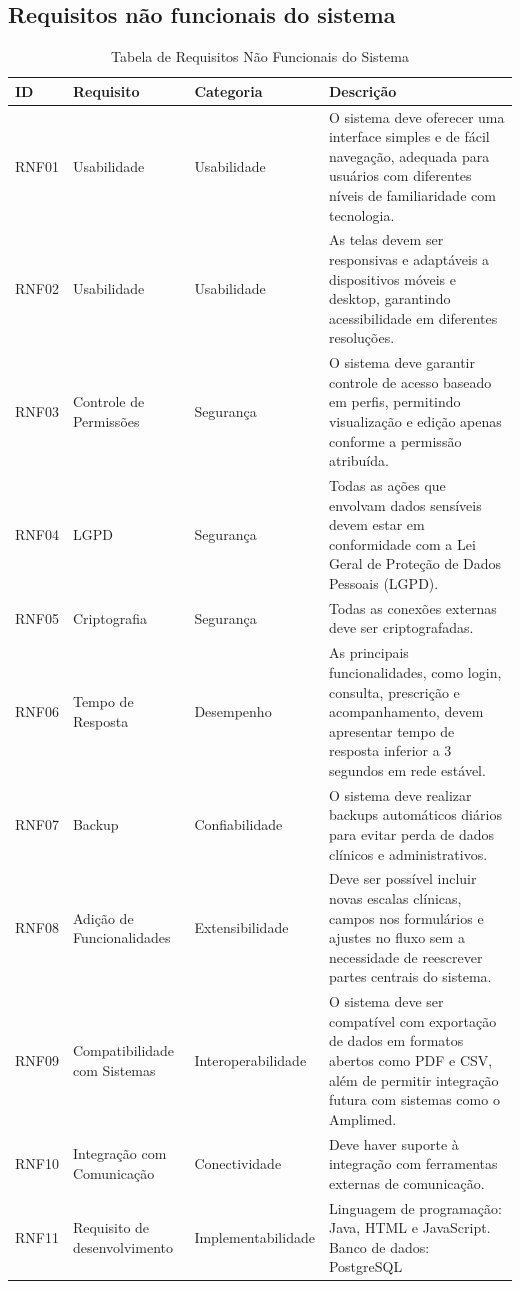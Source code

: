 \href{}{}\documentclass[12pt,portuguese,oneside]{article}
\begin{document}
\subsection{Requisitos não funcionais do sistema}
\begin{table}[H]
\centering
\caption{Tabela de Requisitos Não Funcionais do Sistema}
\begin{tabularx}{\textwidth}{|>{\raggedright\arraybackslash}p{1.5cm}|>{\raggedright\arraybackslash}p{3cm}|>{\raggedright\arraybackslash}p{3.3cm}|>{\raggedright\arraybackslash}X|}
\hline
\rowcolor{gray!20}
\textbf{ID} & \textbf{Requisito} & \textbf{Categoria} & \textbf{Descrição}\\
\hline
RNF01 & Usabilidade & Usabilidade & O sistema deve oferecer uma interface simples e de fácil navegação, adequada para usuários com diferentes níveis de familiaridade com tecnologia.\\
\hline
RNF02 & Usabilidade & Usabilidade & As telas devem ser responsivas e adaptáveis a dispositivos móveis e desktop, garantindo acessibilidade em diferentes resoluções.\\
\hline
RNF03 & Controle de Permissões & Segurança & O sistema deve garantir controle de acesso baseado em perfis, permitindo visualização e edição apenas conforme a permissão atribuída.\\
\hline
RNF04 & LGPD & Segurança & Todas as ações que envolvam dados sensíveis devem estar em conformidade com a Lei Geral de Proteção de Dados Pessoais (LGPD).\\
\hline
RNF05 & Criptografia & Segurança & Todas as conexões externas deve ser criptografadas.\\
\hline
RNF06 & Tempo de Resposta & Desempenho & As principais funcionalidades, como login, consulta, prescrição e acompanhamento, devem apresentar tempo de resposta inferior a 3 segundos em rede estável.\\
\hline
RNF07 & Backup & Confiabilidade & O sistema deve realizar backups automáticos diários para evitar perda de dados clínicos e administrativos.\\
\hline
RNF08 & Adição de Funcionalidades & Extensibilidade & Deve ser possível incluir novas escalas clínicas, campos nos formulários e ajustes no fluxo sem a necessidade de reescrever partes centrais do sistema.\\
\hline
RNF09 & Compatibilidade com Sistemas & Interoperabilidade & O sistema deve ser compatível com exportação de dados em formatos abertos como PDF e CSV, além de permitir integração futura com sistemas como o Amplimed.\\
\hline
RNF10 & Integração com Comunicação & Conectividade & Deve haver suporte à integração com ferramentas externas de comunicação.\\
\hline
RNF11 & Requisito de desenvolvimento & Implementabilidade & Linguagem de programação: Java, HTML e JavaScript. Banco de dados: PostgreSQL \\
\hline
\end{tabularx}
\end{table}
\end{document}

